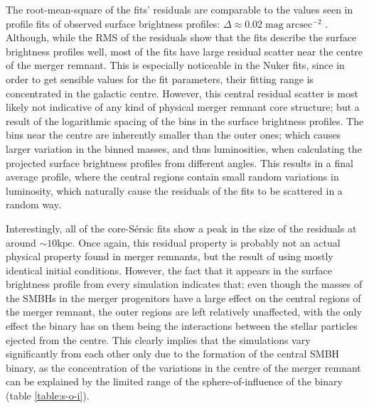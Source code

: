 \documentclass[english, oneside]{HYgradu}
\begin{document}
The root-mean-square of the fits' residuals are comparable to the values seen in profile fits of observed surface brightness profiles: $\Delta \approx 0.02 \; \mathrm{mag \; arcsec^{-2}}$ \citep{Dullo2012}. Although, while the RMS of the residuals show that the fits describe the surface brightness profiles well, most of the fits have large residual scatter near the centre of the merger remnant. This is especially noticeable in the Nuker fits, since in order to get sensible values for the fit parameters, their fitting range is concentrated in the galactic centre. However, this central residual scatter is most likely not indicative of any kind of physical merger remnant core structure; but a result of the logarithmic spacing of the bins in the surface brightness profiles. The bins near the centre are inherently smaller than the outer ones; which causes larger variation in the binned masses, and thus luminosities, when calculating the projected surface brightness profiles from different angles. This results in a final average profile, where the central regions contain small random variations in luminosity, which naturally cause the residuals of the fits to be scattered in a random way.

Interestingly, all of the core-Sérsic fits show a peak in the size of the residuals at around $\sim 10 \mathrm{kpc}$. Once again, this residual property is probably not an actual physical property found in merger remnants, but the result of using mostly identical initial conditions. However, the fact that it appears in the surface brightness profile from every simulation indicates that; even though the masses of the SMBHs in the merger progenitors have a large effect on the central regions of the merger remnant, the outer regions are left relatively unaffected, with the only effect the binary has on them being the interactions between the stellar particles ejected from the centre. This clearly implies that the simulations vary significantly from each other only due to the formation of the central SMBH binary, as the concentration of the variations in the centre of the merger remnant can be explained by the limited range of the sphere-of-influence of the binary (table \ref{table:s-o-i}).
\end{document}
